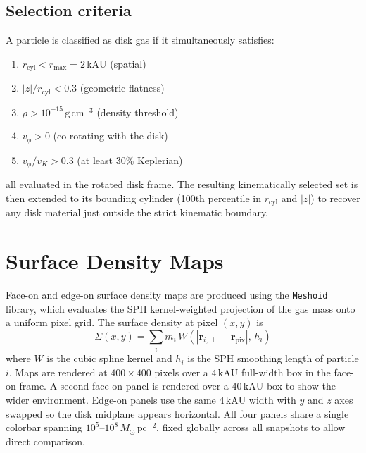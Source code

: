 \documentclass[12pt]{article}
\begin{document}
\subsection*{Selection criteria}

A particle is classified as disk gas if it simultaneously satisfies:
\begin{enumerate}
    \item $r_\mathrm{cyl} < r_\mathrm{max} = 2\,\mathrm{kAU}$ \quad (spatial)
    \item $|z|/r_\mathrm{cyl} < 0.3$ \quad (geometric flatness)
    \item $\rho > 10^{-15}\,\mathrm{g\,cm^{-3}}$ \quad (density threshold)
    \item $v_\phi > 0$ \quad (co-rotating with the disk)
    \item $v_\phi/v_K > 0.3$ \quad (at least 30\% Keplerian)
\end{enumerate}
all evaluated in the rotated disk frame. The resulting kinematically selected set
is then extended to its bounding cylinder (100th percentile in $r_\mathrm{cyl}$
and $|z|$) to recover any disk material just outside the strict kinematic
boundary.


\section{Surface Density Maps}

Face-on and edge-on surface density maps are produced using the \texttt{Meshoid}
library, which evaluates the SPH kernel-weighted projection of the gas mass onto
a uniform pixel grid. The surface density at pixel $(x,y)$ is
\begin{equation}
    \Sigma(x,y) = \sum_i m_i\,W\!\left(|\mathbf{r}_{i,\perp} - \mathbf{r}_\mathrm{pix}|,\,h_i\right)
\end{equation}
where $W$ is the cubic spline kernel and $h_i$ is the SPH smoothing length of
particle $i$. Maps are rendered at $400\times400$ pixels over a $4\,\mathrm{kAU}$
full-width box in the face-on frame. A second face-on panel is rendered over a
$40\,\mathrm{kAU}$ box to show the wider environment. Edge-on panels use the same
$4\,\mathrm{kAU}$ width with $y$ and $z$ axes swapped so the disk midplane
appears horizontal. All four panels share a single colorbar spanning
$10^5$--$10^8\,M_\odot\,\mathrm{pc}^{-2}$, fixed globally across all snapshots
to allow direct comparison.
\end{document}
